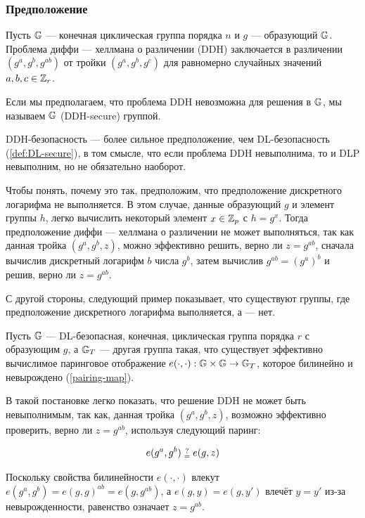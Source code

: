 \subsubsection{Предположение }
\label{def:DDH-secure}

\begin{definition}
Пусть $\mathbb{G}$ — конечная циклическая группа порядка $n$ и $g$ — образующий $\mathbb{G}$. Проблема диффи — хеллмана о различении (DDH) заключается в различении $(g^a,g^b, g^{ab})$ от тройки $(g^a,g^b,g^c)$ для равномерно случайных значений $a,b,c\in \mathbb{Z}_r$. 
\end{definition}

Если мы предполагаем, что проблема DDH невозможна для решения в $\mathbb{G}$, мы называем $\mathbb{G}$  (DDH-secure) группой.

DDH-безопасность — более сильное предположение, чем DL-безопасность (\ref{def:DL-secure}), в том смысле, что если проблема DDH невыполнима, то и DLP невыполним, но не обязательно наоборот.

Чтобы понять, почему это так, предположим, что предположение дискретного логарифма не выполняется. В этом случае, данные образующий $g$ и элемент группы $h$, легко вычислить некоторый элемент $x\in\mathbb{Z}_p$ с $h=g^x$. Тогда предположение диффи — хеллмана о различении не может выполняться, так как данная тройка $(g^a , g^b , z )$, можно эффективно решить, верно ли $z = g^{ab}$, сначала вычислив дискретный логарифм $b$ числа $g^b$, затем вычислив $g^{ab}= (g^a)^b$ и решив, верно ли $z=g^{ab}$.

С другой стороны, следующий пример показывает, что существуют группы, где предположение дискретного логарифма выполняется, а  — нет.

\begin{example}

Пусть $\mathbb{G}$ — DL-безопасная, конечная, циклическая группа порядка $r$ с образующим $g$, а $\mathbb{G}_T$ — другая группа такая, что существует эффективно вычислимое паринговое отображение $e(\cdot,\cdot): \mathbb{G} \times \mathbb{G} \to \mathbb{G}_T$, которое билинейно и невырождено (\ref{pairing-map}).

В такой постановке легко показать, что решение DDH не может быть невыполнимым, так как, данная тройка $(g^a, g^b, z)$, возможно эффективно проверить, верно ли $z = g^{ab}$, используя следующий паринг:

\begin{equation}
e(g^a,g^b) \checkeq e(g,z)
\end{equation}

Поскольку свойства билинейности $e(\cdot,\cdot)$ влекут $e(g^a,g^b)= e(g,g)^{ab}= e(g,g^{ab})$, а $e(g,y)=e(g,y')$ влечёт $y=y'$ из-за невырожденности, равенство означает $z=g^{ab}$.

\end{example}

